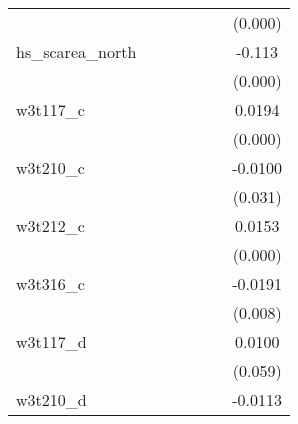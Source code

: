 {\begin{tabular}{l*{6}{c}}
            &                     &                     &                     &                     &                     &     (0.000)         \\
[1em]
hs\_scarea\_north&                     &                     &                     &                     &                     &      -0.113\sym{***}\\
            &                     &                     &                     &                     &                     &     (0.000)         \\
[1em]
w3t117\_c    &                     &                     &                     &                     &                     &      0.0194\sym{***}\\
            &                     &                     &                     &                     &                     &     (0.000)         \\
[1em]
w3t210\_c    &                     &                     &                     &                     &                     &     -0.0100\sym{**} \\
            &                     &                     &                     &                     &                     &     (0.031)         \\
[1em]
w3t212\_c    &                     &                     &                     &                     &                     &      0.0153\sym{***}\\
            &                     &                     &                     &                     &                     &     (0.000)         \\
[1em]
w3t316\_c    &                     &                     &                     &                     &                     &     -0.0191\sym{***}\\
            &                     &                     &                     &                     &                     &     (0.008)         \\
[1em]
w3t117\_d    &                     &                     &                     &                     &                     &      0.0100\sym{*}  \\
            &                     &                     &                     &                     &                     &     (0.059)         \\
[1em]
w3t210\_d    &                     &                     &                     &                     &                     &     -0.0113\sym{**} \\

\end{tabular}}
